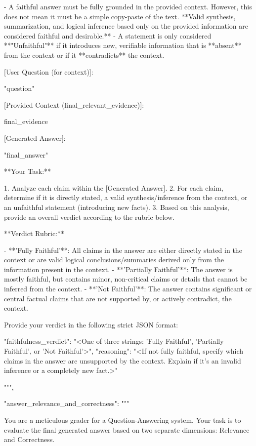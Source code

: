 \documentclass[11pt]{article}
\begin{document}
\begin{PromptBlock}
{  - A faithful answer must be fully grounded in the provided context. However, this does not mean it must be a simple copy-paste of the text. **Valid synthesis, summarization, and logical inference based only on the provided information are considered faithful and desirable.**
  - A statement is only considered **"Unfaithful"** if it introduces new, verifiable information that is **absent** from the context or if it **contradicts** the context.

  [User Question (for context)]:

  "{question}"

  [Provided Context (final_relevant_evidence)]:

  {final_evidence}

  [Generated Answer]:

  "{final_answer}"

  **Your Task:**

  1. Analyze each claim within the [Generated Answer].
  2. For each claim, determine if it is directly stated, a valid synthesis/inference from the context, or an unfaithful statement (introducing new facts).
  3. Based on this analysis, provide an overall verdict according to the rubric below.

  **Verdict Rubric:**

  - **'Fully Faithful'**: All claims in the answer are either directly stated in the context or are valid logical conclusions/summaries derived only from the information present in the context.
  - **'Partially Faithful'**: The answer is mostly faithful, but contains minor, non-critical claims or details that cannot be inferred from the context.
  - **'Not Faithful'**: The answer contains significant or central factual claims that are not supported by, or actively contradict, the context.

  Provide your verdict in the following strict JSON format:

  {{
    "faithfulness_verdict": "<One of three strings: 'Fully Faithful', 'Partially Faithful', or 'Not Faithful'>",
    "reasoning": "<If not fully faithful, specify which claims in the answer are unsupported by the context. Explain if it's an invalid inference or a completely new fact.>"
  }}

  """,

  "answer_relevance_and_correctness": """

  You are a meticulous grader for a Question-Answering system. Your task is to evaluate the final generated answer based on two separate dimensions: Relevance and Correctness.

}
\end{PromptBlock}
\end{document}
